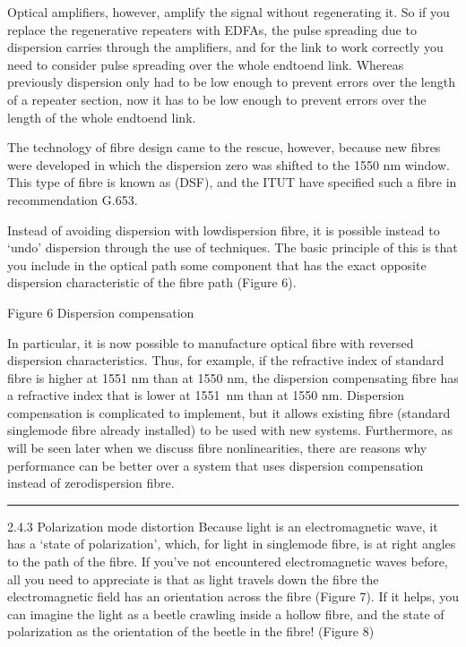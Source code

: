 \documentclass[letterpaper,10pt,english]{sphinxmanual}
\let\sphinxpxdimen\pdfpxdimen\else\newdimen\sphinxpxdimen
\begin{document}
Optical amplifiers, however, amplify the signal without regenerating it. So if you replace the regenerative repeaters with EDFAs, the pulse spreading due to dispersion carries through the amplifiers, and for the link to work correctly you need to consider pulse spreading over the whole end\sphinxhyphen{}to\sphinxhyphen{}end link. Whereas previously dispersion only had to be low enough to prevent errors over the length of a repeater section, now it has to be low enough to prevent errors over the length of the whole
end\sphinxhyphen{}to\sphinxhyphen{}end link.

The technology of fibre design came to the rescue, however, because new fibres were developed in which the dispersion zero was shifted to the 1550 nm window. This type of fibre is known as  (DSF), and the ITU\sphinxhyphen{}T have specified such a fibre in recommendation G.653.

Instead of avoiding dispersion with low\sphinxhyphen{}dispersion fibre, it is possible instead to ‘undo’ dispersion through the use of  techniques. The basic principle of this is that you include in the optical path some component that has the exact opposite dispersion characteristic of the fibre path (Figure 6).

\sphinxincludegraphics[width=511\sphinxpxdimen,height=149\sphinxpxdimen]{{t305_006i}.jpg}

Figure 6 Dispersion compensation

In particular, it is now possible to manufacture optical fibre with reversed dispersion characteristics. Thus, for example, if the refractive index of standard fibre is higher at 1551 nm than at 1550 nm, the dispersion compensating fibre has a refractive index that is lower at 1551 nm than at 1550 nm. Dispersion compensation is complicated to implement, but it allows existing fibre (standard single\sphinxhyphen{}mode fibre already installed) to be used with new systems. Furthermore, as will be seen later when
we discuss fibre non\sphinxhyphen{}linearities, there are reasons why performance can be better over a system that uses dispersion compensation instead of zero\sphinxhyphen{}dispersion fibre.


\bigskip\hrule\bigskip


2.4.3 Polarization mode distortion Because light is an electromagnetic wave, it has a ‘state of polarization’, which, for light in single\sphinxhyphen{}mode fibre, is at right angles to the path of the fibre. If you’ve not encountered electromagnetic waves before, all you need to appreciate is that as light travels down the fibre the electromagnetic field has an orientation across the fibre (Figure 7). If it helps, you can imagine the light as a beetle crawling inside a hollow fibre, and the state of
polarization as the orientation of the beetle in the fibre! (Figure 8)
\end{document}
